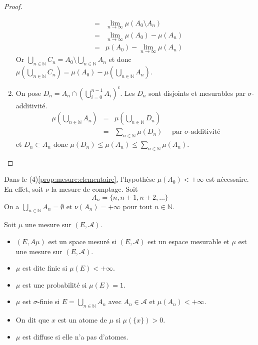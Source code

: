 \begin{proof}
\begin{enumerate}
\begin{eqnarray*}
			      &=& \lim\limits_{n \to \infty} \mu(A_0\setminus A_n) \\
			      &=& \lim\limits_{n \to \infty} \mu(A_0) - \mu(A_n) \\
			      &=& \mu(A_0) - \lim\limits_{n \to \infty} \mu(A_n)
		      \end{eqnarray*}
		      Or $\bigcup\limits_{n \in \mathbb{N}} C_n = A_0 \setminus \bigcup\limits_{n \in \mathbb{N}} A_n$ et donc
		      $\mu(\bigcup\limits_{n \in \mathbb{N}} C_n) = \mu(A_0) - \mu(\bigcup\limits_{n \in \mathbb{N}} A_n)$.
		\item On pose $D_n = A_n \cap \left( \bigcup\limits_{i=0}^{n-1} A_i \right)^c$. Les $D_n$ sont disjoints et mesurables par
		      $\sigma$-additivité.
		      \begin{eqnarray*}
			      \mu(\bigcup\limits_{n \in \mathbb{N}} A_n) &=& \mu(\bigcup\limits_{n \in \mathbb{N}} D_n) \\
			      &=& \sum\limits_{n \in \mathbb{N}} \mu(D_n) \quad \text{ par } \sigma\text{-additivité}
		      \end{eqnarray*}
		      et $D_n \subset A_n$ donc $\mu(D_n) \leq \mu(A_n) \leq \sum\limits_{n \in \mathbb{N}} \mu(A_n)$.
	\end{enumerate}
\end{proof}

\begin{remarque}
	Dans le (4)\ref{prop:mesure:elementaire}, l'hypothèse $\mu(A_0) < +\infty$ est nécessaire. En effet, soit
	$\nu$ la mesure de comptage. Soit
	\[ A_n = \{ n, n+1, n+2, \dots \} \]
	On a $\bigcup\limits_{n \in \mathbb{N}} A_n = \emptyset$ et $\nu(A_n) = +\infty$ pour tout $n \in \mathbb{N}$.
\end{remarque}

\begin{definition}
	Soit $\mu$ une mesure sur $(E, \mathscr{A})$.
	\begin{itemize}
		\item $(E,A\mu)$ est un space mesuré si $(E,\mathscr{A})$ est un espace mesurable et $\mu$ est une mesure sur $ (E, \mathscr{A} ) $.
		\item $\mu$ est dite finie si $\mu(E) < +\infty$.
		\item $\mu$ est une probabilité si $\mu(E) = 1$.
		\item $\mu$ est $\sigma$-finie si $E = \bigcup\limits_{n \in \mathbb{N}} A_n$ avec $A_n \in \mathscr{A}$ et $\mu(A_n) < +\infty$.
		\item On dit que $x$ est un atome de $\mu$ si $\mu(\{x\}) > 0$.
		\item $\mu$ est diffuse si elle n'a pas d'atomes.
	\end{itemize}
\end{definition}
